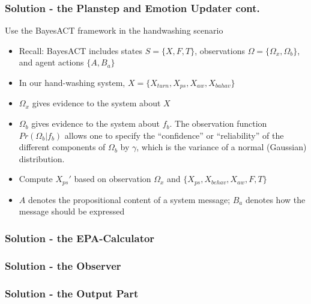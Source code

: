 \documentclass{beamer}
\begin{document}
\begin{frame}
\frametitle{Solution - the Planstep and Emotion Updater cont.}
Use the BayesACT framework in the handwashing scenario
\begin{itemize}
\item Recall: BayesACT includes states $S = \{X, F, T\}$, observations $\Omega = \{\Omega_{x}, \Omega_{b}\}$, and agent actions $\{A, B_{a}\}$
\pause \item In our hand-washing system, $X = \{X_{turn}, X_{ps}, X_{aw}, X_{bahav}\}$
\pause \item $\Omega_{x}$ gives evidence to the system about $X$
\pause \item $\Omega_{b}$ gives evidence to the system about $f_b$. The observation function $Pr(\Omega_b|f_b)$ allows one to specify the ``confidence'' or ``reliability'' of the different components of $\Omega_b$ by $\gamma$, which is the variance of a normal (Gaussian) distribution.
\pause \item Compute $X_{ps}'$ based on observation $\Omega_{x}$ and $\{X_{ps}, X_{behav}, X_{aw}, F, T\}$
\pause \item $A$ denotes the propositional content of a system message; $B_{a}$ denotes how the message should be expressed
\end{itemize}
\end{frame}

\begin{frame}
\frametitle{Solution - the EPA-Calculator}
\end{frame}

\begin{frame}
\frametitle{Solution - the Observer}
\end{frame}

\begin{frame}
\frametitle{Solution - the Output Part}
\end{frame}
\end{document}
